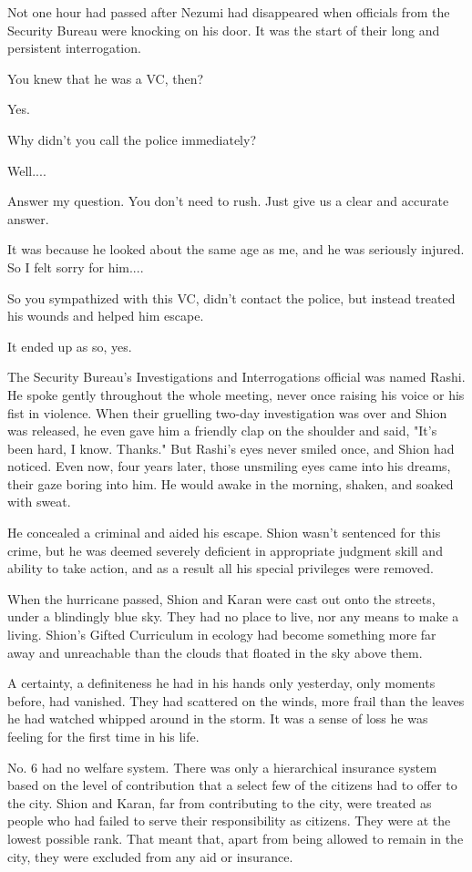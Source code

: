 Not one hour had passed after Nezumi had disappeared when officials from
the Security Bureau were knocking on his door. It was the start of their
long and persistent interrogation.

You knew that he was a VC, then?

Yes.

Why didn't you call the police immediately?

Well....

Answer my question. You don't need to rush. Just give us a clear and
accurate answer.

It was because he looked about the same age as me, and he was seriously
injured. So I felt sorry for him....

So you sympathized with this VC, didn't contact the police, but instead
treated his wounds and helped him escape.

It ended up as so, yes.

The Security Bureau's Investigations and Interrogations official was
named Rashi. He spoke gently throughout the whole meeting, never once
raising his voice or his fist in violence. When their gruelling two-day
investigation was over and Shion was released, he even gave him a
friendly clap on the shoulder and said, "It's been hard, I know.
Thanks." But Rashi's eyes never smiled once, and Shion had noticed. Even
now, four years later, those unsmiling eyes came into his dreams, their
gaze boring into him. He would awake in the morning, shaken, and soaked
with sweat.

He concealed a criminal and aided his escape. Shion wasn't sentenced for
this crime, but he was deemed severely deficient in appropriate judgment
skill and ability to take action, and as a result all his special
privileges were removed.

When the hurricane passed, Shion and Karan were cast out onto the
streets, under a blindingly blue sky. They had no place to live, nor any
means to make a living. Shion's Gifted Curriculum in ecology had become
something more far away and unreachable than the clouds that floated in
the sky above them.

A certainty, a definiteness he had in his hands only yesterday, only
moments before, had vanished. They had scattered on the winds, more
frail than the leaves he had watched whipped around in the storm. It was
a sense of loss he was feeling for the first time in his life.

No. 6 had no welfare system. There was only a hierarchical insurance
system based on the level of contribution that a select few of the
citizens had to offer to the city. Shion and Karan, far from
contributing to the city, were treated as people who had failed to serve
their responsibility as citizens. They were at the lowest possible rank.
That meant that, apart from being allowed to remain in the city, they
were excluded from any aid or insurance.

